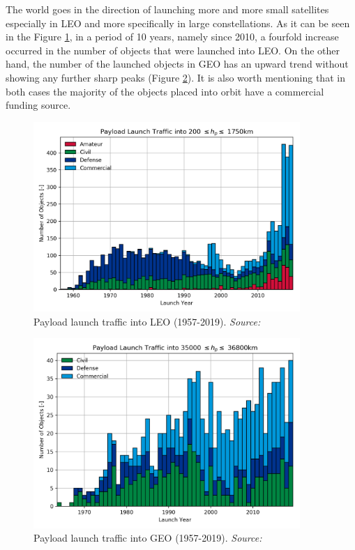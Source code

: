 
The world goes in the direction of launching more and more small satellites especially in LEO and more specifically in large constellations. As it can be seen in the Figure \ref{launch_traffic_LEO}, in a period of 10 years, namely since 2010, a fourfold increase occurred in the number of objects that were launched into LEO. On the other hand, the number of the launched objects in GEO has an upward trend without showing any further sharp peaks (Figure \ref{launch_traffic_GEO}). It is also worth mentioning that in both cases the majority of the objects placed into orbit have a commercial funding source.

\begin{figure}
\centering
\includegraphics[width=0.9\textwidth]{Images/launch_traffic_LEO.png}\caption{Payload launch traffic into LEO (1957-2019). \textit{Source: \cite{ESA 2019}}}
\label{launch_traffic_LEO} 
\end{figure}

\begin{figure}
\centering
\includegraphics[width=0.9\textwidth]{Images/launch_traffic_GEO.png}\caption{Payload launch traffic into GEO (1957-2019). \textit{Source: \cite{ESA 2019}}}
\label{launch_traffic_GEO} 
\end{figure}

